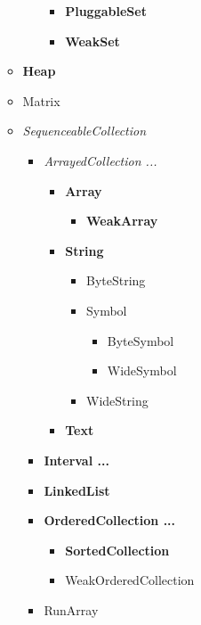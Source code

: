 \documentclass[a4paper,10pt,twoside]{book}
\begin{document}
\begin{figure}
\begin{center}
\begin{itemize}
\begin{itemize}
\begin{itemize}
\begin{itemize}
\begin{itemize}
                \end{itemize}
            \item{\textbf{PluggableSet}}
            \item{\textbf{WeakSet}}
            \end{itemize}
        \end{itemize}
    \item{\textbf{Heap}}
    \item{Matrix}
    \item{\emph{SequenceableCollection}}
        \begin{itemize}
        \item{\emph{ArrayedCollection ...}}
            \begin{itemize}
            \item{\textbf{Array}}
                \begin{itemize}
                \item{\textbf{WeakArray}}
                \end{itemize}
            \item{\textbf{String}}
                \begin{itemize}
                \item{ByteString}
                \item{Symbol}
                    \begin{itemize}
                    \item{ByteSymbol}
                    \item{WideSymbol}
                    \end{itemize}
                \item{WideString}
                \end{itemize}
            \item{\textbf{Text}}
            \end{itemize}
        \item{\textbf{Interval ...}}
        \item{\textbf{LinkedList}}
        \item{\textbf{OrderedCollection ...}}
            \begin{itemize}
            \item{\textbf{SortedCollection}}
            \item{WeakOrderedCollection}
            \end{itemize}
        \item{RunArray}
        \end{itemize}
    \end{itemize}
\end{itemize}


\end{center}
\end{figure}
\end{document}

